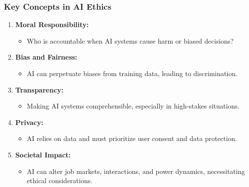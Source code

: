 \documentclass[aspectratio=169]{beamer}
\begin{document}
\begin{frame}[fragile]
  \frametitle{Key Concepts in AI Ethics}
  \begin{enumerate}
    \item \textbf{Moral Responsibility:}
      \begin{itemize}
        \item Who is accountable when AI systems cause harm or biased decisions?
      \end{itemize}
      
    \item \textbf{Bias and Fairness:}
      \begin{itemize}
        \item AI can perpetuate biases from training data, leading to discrimination.
      \end{itemize}
      
    \item \textbf{Transparency:}
      \begin{itemize}
        \item Making AI systems comprehensible, especially in high-stakes situations.
      \end{itemize}
      
    \item \textbf{Privacy:}
      \begin{itemize}
        \item AI relies on data and must prioritize user consent and data protection.
      \end{itemize}
      
    \item \textbf{Societal Impact:}
      \begin{itemize}
        \item AI can alter job markets, interactions, and power dynamics, necessitating ethical considerations.
      \end{itemize}
  \end{enumerate}
\end{frame}
\end{document}
